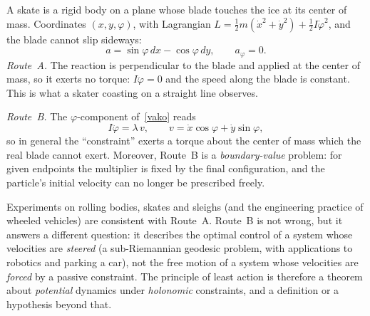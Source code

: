\begin{example}[A skate]\label{skate}
A skate is a rigid body on a plane whose blade touches the ice at its center
of mass. Coordinates $(x,y,\varphi)$, with Lagrangian
$L=\tfrac12m(\dot x^2+\dot y^2)+\tfrac12I\dot\varphi^2$, and the blade cannot
slip sideways:
\[
  a=\sin\varphi\,dx-\cos\varphi\,dy,\qquad a_\varphi=0 .
\]
\emph{Route~A.} The reaction is perpendicular to the blade and applied at the
center of mass, so it exerts no torque: $I\ddot\varphi=0$ and the speed along
the blade is constant. This is what a skater coasting on a straight line
observes.

\emph{Route~B.} The $\varphi$-component of~\eqref{vako} reads
\[
  I\ddot\varphi=\lambda\,v,\qquad v=\dot x\cos\varphi+\dot y\sin\varphi,
\]
so in general the ``constraint'' exerts a torque about the center of mass
which the real blade cannot exert. Moreover, Route~B is a
\emph{boundary-value} problem: for given endpoints the multiplier is fixed
by the final configuration, and the particle's initial velocity can no longer be
prescribed freely.
\end{example}

Experiments on rolling bodies, skates and sleighs (and the engineering
practice of wheeled vehicles) are consistent with Route~A. Route~B is not
wrong, but it answers a different question: it describes the optimal control
of a system whose velocities are \emph{steered} (a sub-Riemannian
geodesic problem, with applications to robotics and parking a car), not the
free motion of a system whose velocities are \emph{forced} by a passive
constraint. The principle of least action is therefore a theorem about
\emph{potential} dynamics under \emph{holonomic} constraints, and a
definition or a hypothesis beyond that.

